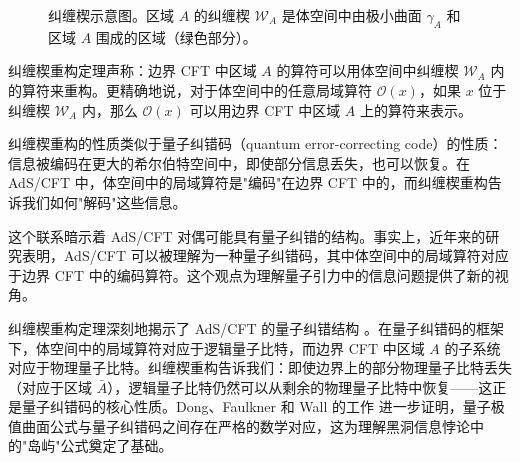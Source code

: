 \begin{figure}[htbp]
\centering
{}
\caption{纠缠楔示意图。区域 $A$ 的纠缠楔 $\mathcal{W}_A$ 是体空间中由极小曲面 $\gamma_A$ 和区域 $A$ 围成的区域（绿色部分）。}
\label{fig:EW}
\end{figure}

\begin{theorem}[纠缠楔重构] \label{thm:EW_reconstruction}
纠缠楔重构定理声称：边界 CFT 中区域 $A$ 的算符可以用体空间中纠缠楔 $\mathcal{W}_A$ 内的算符来重构。更精确地说，对于体空间中的任意局域算符 $\mathcal{O}(x)$，如果 $x$ 位于纠缠楔 $\mathcal{W}_A$ 内，那么 $\mathcal{O}(x)$ 可以用边界 CFT 中区域 $A$ 上的算符来表示。
\end{theorem}

\begin{remark}[量子纠错码的联系]
纠缠楔重构的性质类似于量子纠错码（quantum error-correcting code）的性质：信息被编码在更大的希尔伯特空间中，即使部分信息丢失，也可以恢复。在 AdS/CFT 中，体空间中的局域算符是"编码"在边界 CFT 中的，而纠缠楔重构告诉我们如何"解码"这些信息。

这个联系暗示着 AdS/CFT 对偶可能具有量子纠错的结构。事实上，近年来的研究表明，AdS/CFT 可以被理解为一种量子纠错码，其中体空间中的局域算符对应于边界 CFT 中的编码算符。这个观点为理解量子引力中的信息问题提供了新的视角。
\end{remark}

\begin{remark}[纠缠楔与量子纠错码]
纠缠楔重构定理深刻地揭示了 AdS/CFT 的量子纠错结构 \cite{Dong2016}。在量子纠错码的框架下，体空间中的局域算符对应于逻辑量子比特，而边界 CFT 中区域 $A$ 的子系统对应于物理量子比特。纠缠楔重构告诉我们：即使边界上的部分物理量子比特丢失（对应于区域 $\bar{A}$），逻辑量子比特仍然可以从剩余的物理量子比特中恢复——这正是量子纠错码的核心性质。Dong、Faulkner 和 Wall 的工作 \cite{Dong2016} 进一步证明，量子极值曲面公式与量子纠错码之间存在严格的数学对应，这为理解黑洞信息悖论中的"岛屿"公式奠定了基础。
\end{remark}

